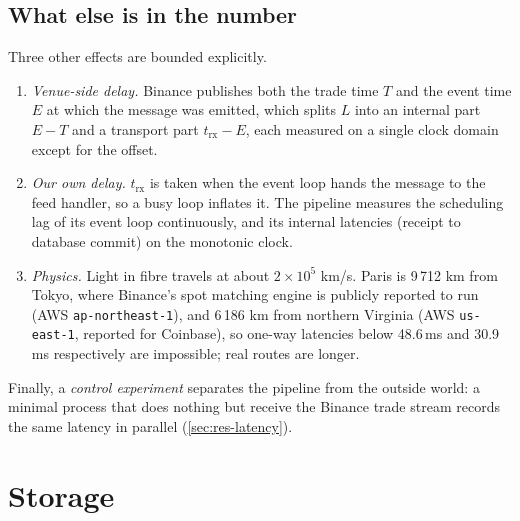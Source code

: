 \documentclass[11pt,a4paper]{article}
\newcommand{\code}[1]{\texttt{#1}}
\newcommand{\ms}{\,ms}
\begin{document}
\subsection{What else is in the number}

Three other effects are bounded explicitly.
\begin{enumerate}[nosep]
  \item \emph{Venue-side delay.} Binance publishes both the trade time $T$ and the event time $E$ at which the
        message was emitted, which splits $L$ into an internal part $E - T$ and a transport part
        $t_{\mathrm{rx}} - E$, each measured on a single clock domain except for the offset.
  \item \emph{Our own delay.} $t_{\mathrm{rx}}$ is taken when the event loop hands the message to the feed
        handler, so a busy loop inflates it. The pipeline measures the scheduling lag of its event loop
        continuously, and its internal latencies (receipt to database commit) on the monotonic clock.
  \item \emph{Physics.} Light in fibre travels at about $2\times10^5$ km/s. Paris is 9\,712 km from Tokyo, where
        Binance's spot matching engine is publicly reported to run (AWS \code{ap-northeast-1}), and 6\,186 km
        from northern Virginia (AWS \code{us-east-1}, reported for Coinbase), so one-way latencies below 48.6\ms{}
        and 30.9\ms{} respectively are impossible; real routes are longer.
\end{enumerate}
Finally, a \emph{control experiment} separates the pipeline from the outside world: a minimal process that does
nothing but receive the Binance trade stream records the same latency in parallel (\cref{sec:res-latency}).

\section{Storage}\label{sec:storage}
\end{document}
